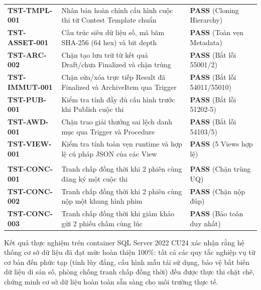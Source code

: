 \begin{table}[!ht]
\begin{tabularx}{\textwidth}{>{\bfseries\ttfamily}p{2.6cm}>{\raggedright\arraybackslash}X>{\raggedright\arraybackslash}p{2.6cm}}
\midrule
TST-TMPL-001 & Nhân bản hoàn chỉnh cấu hình cuộc thi từ Contest Template chuẩn & \textbf{PASS} (Cloning Hierarchy) \\
TST-ASSET-001 & Cấu trúc siêu dữ liệu số, mã băm SHA-256 (64 hex) và bit depth & \textbf{PASS} (Toàn vẹn Metadata) \\
TST-ARC-002 & Chặn tạo lưu trữ từ kết quả Draft/chưa Finalized và chặn trùng & \textbf{PASS} (Bắt lỗi 55001/2) \\
TST-IMMUT-001 & Chặn sửa/xóa trực tiếp Result đã Finalized và ArchiveItem qua Trigger & \textbf{PASS} (Bắt lỗi 54011/55010) \\
TST-PUB-001 & Kiểm tra tính đầy đủ cấu hình trước khi Publish cuộc thi & \textbf{PASS} (Bắt lỗi 51202-5) \\
TST-AWD-001 & Chặn trao giải thưởng sai lệch danh mục qua Trigger và Procedure & \textbf{PASS} (Bắt lỗi 54103/5) \\
TST-VIEW-001 & Kiểm tra tính toàn vẹn runtime và hợp lệ cú pháp JSON của các View & \textbf{PASS} (5 Views hợp lệ) \\
\midrule
\multicolumn{3}{l}{\textbf{Nhóm 4: Mô phỏng Tranh chấp Đồng thời Hai Phiên (Concurrency Race Conditions)}} \\
\midrule
TST-CONC-001 & Tranh chấp đồng thời khi 2 phiên cùng đăng ký một cuộc thi & \textbf{PASS} (Chặn trùng UQ) \\
TST-CONC-002 & Tranh chấp đồng thời khi 2 phiên cùng nộp một khung hình phim & \textbf{PASS} (Chặn nộp đúp) \\
TST-CONC-003 & Tranh chấp đồng thời khi giám khảo gửi 2 phiếu chấm cùng lúc & \textbf{PASS} (Bảo toàn duy nhất) \\
\bottomrule
\end{tabularx}
\end{table}

Kết quả thực nghiệm trên container SQL Server 2022 CU24 xác nhận rằng hệ thống cơ sở dữ liệu đã đạt mức hoàn thiện 100\%: tất cả các quy tắc nghiệp vụ từ cơ bản đến phức tạp (tính lũy đẳng, cấu hình mẫu tái sử dụng, bảo vệ bất biến dữ liệu di sản số, phòng chống tranh chấp đồng thời) đều được thực thi chặt chẽ, chứng minh cơ sở dữ liệu hoàn toàn sẵn sàng cho môi trường thực tế.
